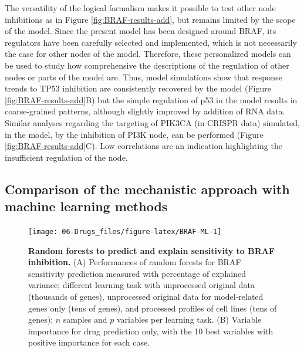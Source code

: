 \documentclass[a4paper,12pt,twoside,onecolumn,openright,final,oldfontcommands]{memoir}
\begin{document}
The versatility of the logical formalism makes it possible to test other
node inhibitions as in Figure \ref{fig:BRAF-results-add}, but remains
limited by the scope of the model. Since the present model has been
designed around BRAF, its regulators have been carefully selected and
implemented, which is not necessarily the case for other nodes of the
model. Therefore, these personalized models can be used to study how
comprehensive the descriptions of the regulation of other nodes or parts
of the model are. Thus, model simulations show that response trends to
TP53 inhibition are consistently recovered by the model (Figure
\ref{fig:BRAF-results-add}B) but the simple regulation of p53 in the
model results in coarse-grained patterns, although slightly improved by
addition of RNA data. Similar analyses regarding the targeting of PIK3CA
(in CRISPR data) simulated, in the model, by the inhibition of PI3K
node, can be performed (Figure \ref{fig:BRAF-results-add}C). Low
correlations are an indication highlighting the insufficient regulation
of the node.

\subsection{Comparison of the mechanistic approach with machine learning
methods}\label{comparison-of-the-mechanistic-approach-with-machine-learning-methods}

\begin{figure}

{\centering \texttt{[image: 06-Drugs\_files/figure-latex/BRAF-ML-1]} 

}

\caption[Application of personalized models to other CRISPR targets]{\textbf{Random forests to predict and explain
sensitivity to BRAF inhibition.} (A) Performances of random forests for
BRAF sensitivity prediction measured with percentage of explained
variance; different learning task with unprocessed original data
(thousands of genes), unprocessed original data for model-related genes
only (tens of genes), and processed profiles of cell lines (tens of
genes); \(n\) samples and \(p\) variables per learning task. (B)
Variable importance for drug prediction only, with the 10 best variables
with positive importance for each case.}\label{fig:BRAF-ML}
\end{figure}
\end{document}
